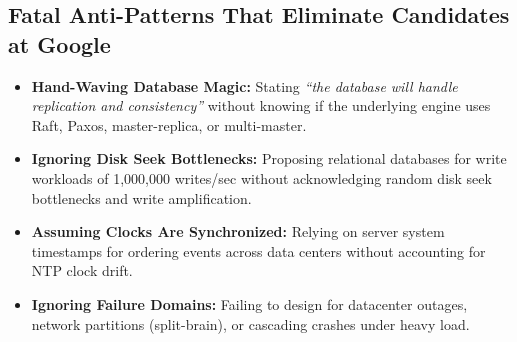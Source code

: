 \documentclass[10pt,journal,compsoc,onecolumn]{IEEEtran}
\begin{document}
\subsection{Fatal Anti-Patterns That Eliminate Candidates at Google}
\begin{itemize}
    \item \textbf{Hand-Waving Database Magic:} Stating \emph{``the database will handle replication and consistency''} without knowing if the underlying engine uses Raft, Paxos, master-replica, or multi-master.
    \item \textbf{Ignoring Disk Seek Bottlenecks:} Proposing relational databases for write workloads of 1,000,000 writes/sec without acknowledging random disk seek bottlenecks and write amplification.
    \item \textbf{Assuming Clocks Are Synchronized:} Relying on server system timestamps for ordering events across data centers without accounting for NTP clock drift.
    \item \textbf{Ignoring Failure Domains:} Failing to design for datacenter outages, network partitions (split-brain), or cascading crashes under heavy load.
\end{itemize}
\end{document}
